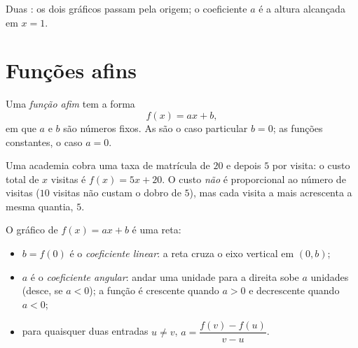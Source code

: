 \begin{omfigure}

{\small Duas : os dois gráficos passam pela origem; o
coeficiente $a$ é a altura alcançada em $x = 1$.}
\end{omfigure}

\section{Funções afins}

\begin{definition}\label{def:g9:linfunc:affine}
Uma \emph{função afim} tem a forma
\[
f(x) = a x + b ,
\]
em que $a$ e $b$ são números fixos. As  são o caso
particular $b = 0$; as funções constantes, o caso $a = 0$.
\end{definition}

\begin{example}
Uma academia cobra uma taxa de matrícula de $20$ e depois $5$ por
visita: o custo total de $x$ visitas é $f(x) = 5x + 20$. O custo
\emph{não} é proporcional ao número de visitas ($10$ visitas não custam
o dobro de $5$), mas cada visita a mais acrescenta a mesma quantia,
$5$.
\end{example}

\begin{proposition}\label{prop:g9:linfunc:affinegraph}
O gráfico de $f(x) = ax + b$ é uma reta:
\begin{itemize}
  \item $b = f(0)$ é o \emph{coeficiente linear}: a reta cruza o eixo
        vertical em $(0, b)$;
  \item $a$ é o \emph{coeficiente angular}:
        andar uma unidade para a direita sobe $a$ unidades (desce, se
        $a < 0$); a função é crescente quando $a > 0$ e decrescente
        quando $a < 0$;
  \item para quaisquer duas entradas $u \neq v$,
        $a = \dfrac{f(v) - f(u)}{v - u}$.
\end{itemize}
\end{proposition}

